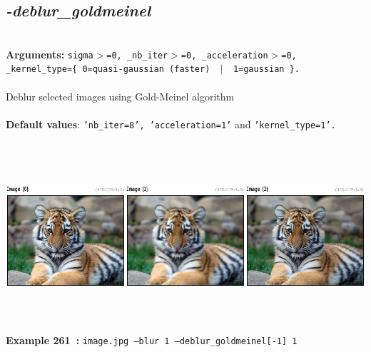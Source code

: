 \documentclass[a4paper,11pt,twoside]{book}
\begin{document}
\subsection{\emph{-deblur\_goldmeinel} }\vspace*{-0.5em}
~\\\textbf{Arguments: } 
{\small \texttt{sigma$>$=0, \_nb\_iter$>$=0, \_acceleration$>$=0, \_kernel\_type=\{ 0=quasi-gaussian (faster) ~$|$~ 1=gaussian \}.}}\\~\\
Deblur selected images using Gold-Meinel algorithm
~\\~\\\textbf{Default values}: {\small \texttt{'nb\_iter=8', 'acceleration=1'} and \texttt{'kernel\_type=1'.}}
\begin{center}\includegraphics[keepaspectratio=true,height=7cm,width=\textwidth]{img/gmic_def261.jpg}\\
{\footnotesize \textbf{Example 261~:} \texttt{image.jpg --blur 1 --deblur\_goldmeinel[-1] 1}}
\end{center}
\end{document}
